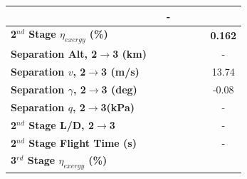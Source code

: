 \begin{table}[ht!]
\begin{tabular}{l c c c c c c}
		& \firstsecondSeparationgammaIspOneHundredTenNoReturn
		& -
		\\
		\hline 
		\textbf{2$^{nd}$ Stage $\eta_{exergy}$ (\%)}
		& \textbf{\secondExergyEffIspNinetyNoReturn}
		& \textbf{\secondExergyEffIspNinetyFiveNoReturn}
		& \textbf{\secondExergyEffIspStandardNoReturn}
		& \textbf{\secondExergyEffIspOneHundredFiveNoReturn}
		& \textbf{\secondExergyEffIspOneHundredTenNoReturn}
		& \textbf{0.162}
		\\
		\textbf{Separation Alt, 2$\rightarrow$3 (km)}
		& \secondthirdSeparationAltIspNinetyNoReturn
		& \secondthirdSeparationAltIspNinetyFiveNoReturn
		& \secondthirdSeparationAltIspStandardNoReturn
		& \secondthirdSeparationAltIspOneHundredFiveNoReturn
		& \secondthirdSeparationAltIspOneHundredTenNoReturn
		& -
		\\
		\textbf{Separation $v$, 2$\rightarrow$3 (m/s)}
		& \secondthirdSeparationvIspNinetyNoReturn
		& \secondthirdSeparationvIspNinetyFiveNoReturn
		& \secondthirdSeparationvIspStandardNoReturn
		& \secondthirdSeparationvIspOneHundredFiveNoReturn
		& \secondthirdSeparationvIspOneHundredTenNoReturn
		&13.74
		\\
		\textbf{Separation $\gamma$, 2$\rightarrow$3 (deg)}
		& \secondthirdSeparationgammaIspNinetyNoReturn
		& \secondthirdSeparationgammaIspNinetyFiveNoReturn
		& \secondthirdSeparationgammaIspStandardNoReturn
		& \secondthirdSeparationgammaIspOneHundredFiveNoReturn
		& \secondthirdSeparationgammaIspOneHundredTenNoReturn
		&-0.08
		\\
		\textbf{Separation $q$, 2$\rightarrow$3(kPa)}
		& \secondthirdSeparationqIspNinetyNoReturn
		& \secondthirdSeparationqIspNinetyFiveNoReturn
		& \secondthirdSeparationqIspStandardNoReturn
		& \secondthirdSeparationqIspOneHundredFiveNoReturn
		& \secondthirdSeparationqIspOneHundredTenNoReturn
		& -
		\\
		\textbf{2$^{nd}$ Stage L/D, 2$\rightarrow$3}
		& \secondthirdSeparationLDIspNinetyNoReturn
		& \secondthirdSeparationLDIspNinetyFiveNoReturn
		& \secondthirdSeparationLDIspStandardNoReturn
		& \secondthirdSeparationLDIspOneHundredFiveNoReturn
		& \secondthirdSeparationLDIspOneHundredTenNoReturn
		& -
		\\
		\textbf{2$^{nd}$ Stage Flight Time (s)}
		& \secondFlightTimeIspNinetyNoReturn
		& \secondFlightTimeIspNinetyFiveNoReturn
		& \secondFlightTimeIspStandardNoReturn
		& \secondFlightTimeIspOneHundredFiveNoReturn
		& \secondFlightTimeIspOneHundredTenNoReturn
		& -
		\\
		\hline 
		\textbf{3$^{rd}$ Stage $\eta_{exergy}$ (\%)}

\end{tabular}
\end{table}
